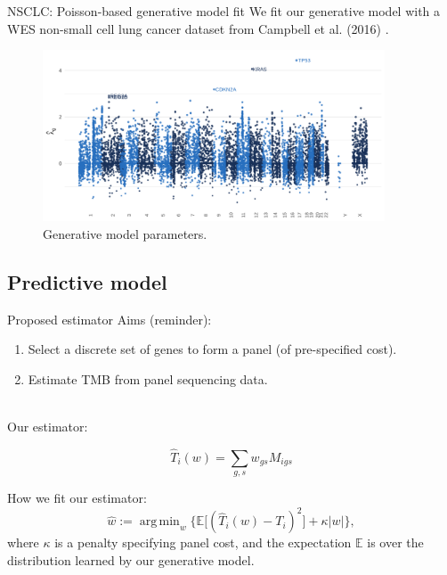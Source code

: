 \documentclass{beamer}
\DeclareMathOperator*{\argmin}{arg\,min}
\begin{document}
\begin{frame}{NSCLC: Poisson-based generative model fit}
We fit our generative model with a WES non-small cell lung cancer dataset from Campbell et al. (2016) \citep{campbell_distinct_2016}.
\begin{figure}[htbp]
\centering
\includegraphics[width=4in]{../results/figures/fig4.png}
\caption{Generative model parameters. \citep{bradley_data-driven_2021}\label{fig:3}}
\end{figure}
\end{frame}



\subsection{Predictive model}
\begin{frame}{Proposed estimator}
Aims (reminder): 

\begin{enumerate}[1]
\item Select a discrete set of genes to form a panel (of pre-specified cost). 
\item Estimate TMB from panel sequencing data.
\end{enumerate} 
~\\
Our estimator:

\begin{equation}
    \hat{T}_i(w) = \sum_{g,s} w_{gs} M_{igs}
\end{equation}

How we fit our estimator:
\begin{equation}
    \hat{w} := \argmin_w \bigg\{ \mathbb{E}\big[(\hat{T}_i(w) - T_i)^2\big] + \kappa |w| \bigg\} ,
\end{equation}
where $\kappa$ is a penalty specifying panel cost, and the expectation $\mathbb{E}$ is over the distribution learned by our generative model.
\end{frame}
\end{document}
